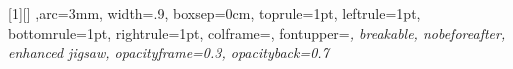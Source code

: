 [1][]{
    ,arc=3mm,
width=.9\textwidth,%
    boxsep=0cm,
    toprule=1pt,
    leftrule=1pt,
    bottomrule=1pt,
    rightrule=1pt,
    colframe=\TitlePageColor,
    fontupper=\raggedleft\fontsize{16pt}{14pt}\itshape,
    breakable,
    nobeforeafter,
    enhanced jigsaw,
    opacityframe=0.3,
    opacityback=0.7
}







